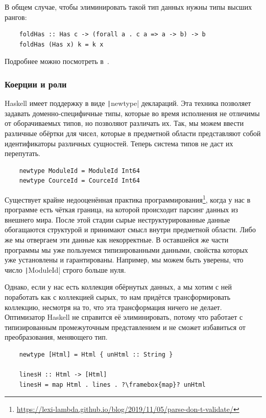 В общем случае, чтобы элиминировать такой тип данных нужны типы высших рангов:
\begin{verbatim}
    foldHas :: Has c -> (forall a . c a => a -> b) -> b
    foldHas (Has x) k = k x
\end{verbatim}

Подробнее можно посмотреть в~\cite[глава 7]{maguire-types}.

\subsubsection{Коерции и роли} \label{subsubsec:coercions}

Haskell имеет поддержку  в виде \texttt|newtype| деклараций.
Эта техника позволяет задавать доменно-специфичные типы, которые во время исполнения не отличимы от оборачиваемых типов, но позволяют различать их.
Так, мы можем ввести различные обёртки для чисел, которые в предметной области представляют собой идентификаторы различных сущностей.
Теперь система типов не даст их перепутать.
\begin{verbatim}
    newtype ModuleId = ModuleId Int64
    newtype CourceId = CourceId Int64
\end{verbatim}

Существует крайне недооценённая практика программирования\footnote{\url{https://lexi-lambda.github.io/blog/2019/11/05/parse-don-t-validate/}}, когда у нас в программе есть чёткая граница, на которой происходит парсинг данных из внешнего мира.
После этой стадии сырые неструктурированные данные обогащаются структурой и принимают смысл внутри предметной области.
Либо же мы отвергаем эти данные как некорректные.
В оставшейся же части программы мы уже пользуемся типизированными данными, свойства которых уже установлены и гарантированы.
Например, мы можем быть уверены, что число \texttt|ModuleId| строго больше нуля.

Однако, если у нас есть коллекция обёрнутых данных, а мы хотим с ней поработать как с коллекцией сырых, то нам придётся трансформировать коллекцию, несмотря на то, что эта трансформация ничего не делает.
Оптимизатор Haskell не справится её элиминировать, потому что работает с типизированным промежуточным представлением и не сможет избавиться от преобразования, меняющего тип.
\begin{verbatim}
    newtype [Html] = Html { unHtml :: String }

    linesH :: Html -> [Html]
    linesH = map Html . lines . ?\framebox{map}? unHtml
\end{verbatim}

